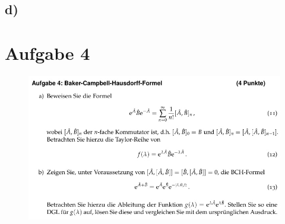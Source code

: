     \subsection{d)}


\section{Aufgabe 4}

    \begin{figure}[H]
        \centering
        \includegraphics[width=\textwidth]{images/Aufgabe4.jpg}
        \label{fig:5}
    \end{figure}


